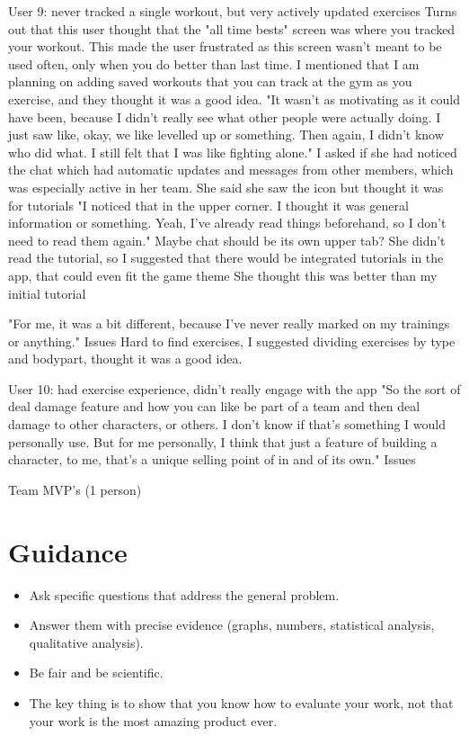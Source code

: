 \documentclass{l4proj}
\begin{document}
User 9: never tracked a single workout, but very actively updated exercises
  Turns out that this user thought that the "all time bests" screen was where you tracked your workout. This made the user frustrated as this screen wasn't meant to be used often, only when you do better than last time.
    I mentioned that I am planning on adding saved workouts that you can track at the gym as you exercise, and they thought it was a good idea.
  "It wasn't as motivating as it could have been, because I didn't really see what other people were actually doing. I just saw like, okay, we like levelled up or something. Then again, I didn't know who did what. I still felt that I was like fighting alone."
    I asked if she had noticed the chat which had automatic updates and messages from other members, which was especially active in her team. She said she saw the icon but thought it was for tutorials
      "I noticed that in the upper corner. I thought it was general information or something. Yeah, I've already read things beforehand, so I don't need to read them again."
        Maybe chat should be its own upper tab?
    She didn't read the tutorial, so I suggested that there would be integrated tutorials in the app, that could even fit the game theme
      She thought this was better than my initial tutorial

  "For me, it was a bit different, because I've never really marked on my trainings or anything."
  Issues
     Hard to find exercises, I suggested dividing exercises by type and bodypart, thought it was a good idea.


User 10: had exercise experience, didn't really engage with the app
  "So the sort of deal damage feature and how you can like be part of a team and then deal damage to other characters, or others. I don't know if that's something I would personally use. But for me personally, I think that just a feature of building a character, to me, that's a unique selling point of in and of its own." 
  Issues  










Team MVP's (1 person)









\section{Guidance}
\begin{itemize}
    \item
        Ask specific questions that address the general problem.
    \item
        Answer them with precise evidence (graphs, numbers, statistical
        analysis, qualitative analysis).
    \item
        Be fair and be scientific.
    \item
        The key thing is to show that you know how to evaluate your work, not
        that your work is the most amazing product ever.
\end{itemize}
\end{document}
